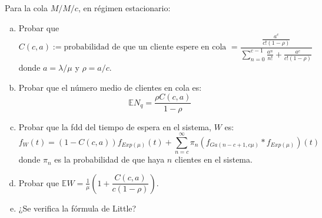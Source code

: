 \documentclass[twoside]{article}
\begin{document}
\begin{ejercicio}{3}
 Para la cola $M/M/c$, en régimen estacionario:
\begin{enumerate}[(a)]
\item Probar que
$$
C(c,a):= \mbox{probabilidad de que un cliente espere en cola } = \frac{ \frac{a^{c}}{c! (1- \rho)}}{  \sum_{n=0}^{c-1} \frac{a^{n}}{n!} + \frac{a^{c}}{c! (1-\rho)} }
$$ 
donde $a=\lambda / \mu$ y $\rho = a/c$.
\item Probar que el número medio de clientes en cola es:	
$$
\mathbb{E} N_{q} = \dfrac{ \rho C(c,a)}{1- \rho}
$$
\item Probar que la fdd del tiempo de espera en el sistema, $W$ es:
$$
f_{W}(t) = (1-C(c,a)) f_{Exp(\mu)} (t) + \displaystyle \sum_{n=c}^{\infty} \pi_{n} ( f_{Ga(n-c+1,c\mu)} * f_{Exp(\mu)})(t)
$$
donde $\pi_{n}$ es la probabilidad de que haya $n$ clientes en el sistema.
\item Probar que $\mathbb{E}W = \frac{1}{\mu} \left( 1+ \dfrac{C(c,a)}{c ( 1- \rho)} \right)$.
\item ¿Se verifica la fórmula de Little? 	
\end{enumerate}
	
\end{ejercicio}
\end{document}
